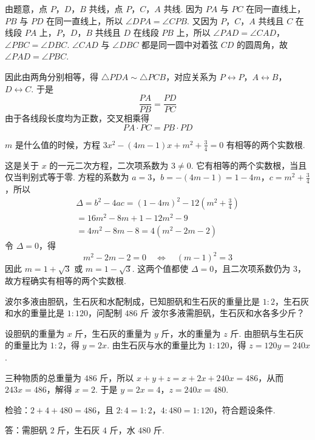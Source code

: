 \begin{solution}

由题意，点 \(P\)，\(D\)，\(B\) 共线，点 \(P\)，\(C\)，\(A\) 共线. 因为 \(PA\) 与 \(PC\) 在同一直线上，\(PB\) 与 \(PD\) 在同一直线上，所以 \(\angle DPA=\angle CPB\). 又因为 \(P\)，\(C\)，\(A\) 共线且 \(C\) 在线段 \(PA\) 上，\(P\)，\(D\)，\(B\) 共线且 \(D\) 在线段 \(PB\) 上，所以 \(\angle PAD=\angle CAD\)，\(\angle PBC=\angle DBC\). \(\angle CAD\) 与 \(\angle DBC\) 都是同一圆中对着弦 \(CD\) 的圆周角，故 \(\angle PAD=\angle PBC\).

因此由两角分别相等，得 \(\triangle PDA\sim\triangle PCB\)，对应关系为 \(P\leftrightarrow P\)，\(A\leftrightarrow B\)，\(D\leftrightarrow C\). 于是
\[
\frac{PA}{PB}=\frac{PD}{PC}
\]
由于各线段长度均为正数，交叉相乘得
\[
PA\cdot PC=PB\cdot PD
\]
\end{solution}

\begin{problem}
\(m\) 是什么值的时候，方程 \(3x^2-\left(4m-1\right)x+m^2+\frac{3}{4}=0\) 有相等的两个实数根.
\end{problem}

\begin{solution}
这是关于 \(x\) 的一元二次方程，二次项系数为 \(3\ne0\). 它有相等的两个实数根，当且仅当判别式等于零. 方程的系数为 \(a=3\)，\(b=-(4m-1)=1-4m\)，\(c=m^2+\frac{3}{4}\)，所以
\[
\begin{gathered}
\Delta=b^2-4ac
=(1-4m)^2-12\left(m^2+\frac{3}{4}\right)\\
=16m^2-8m+1-12m^2-9\\
=4m^2-8m-8=4\left(m^2-2m-2\right)
\end{gathered}
\]
令 \(\Delta=0\)，得
\[
m^2-2m-2=0\quad\Longleftrightarrow\quad\left(m-1\right)^2=3
\]
因此 \(m=1+\sqrt{3}\) 或 \(m=1-\sqrt{3}\). 这两个值都使 \(\Delta=0\)，且二次项系数仍为 \(3\)，故方程确实有相等的两个实数根.
\end{solution}

\begin{problem}
波尔多液由胆矾，生石灰和水配制成，已知胆矾和生石灰的重量比是 \(1:2\)，生石灰和水的重量比是 \(1:120\)，问配制 \(486\text{ 斤}\) 波尔多液需胆矾，生石灰和水各多少斤？
\end{problem}

\begin{solution}
设胆矾的重量为 \(x\text{ 斤}\)，生石灰的重量为 \(y\text{ 斤}\)，水的重量为 \(z\text{ 斤}\). 由胆矾与生石灰的重量比为 \(1:2\)，得 \(y=2x\). 由生石灰与水的重量比为 \(1:120\)，得 \(z=120y=240x\).

三种物质的总重量为 \(486\text{ 斤}\)，所以 \(x+y+z=x+2x+240x=486\)，从而 \(243x=486\)，解得 \(x=2\). 于是 \(y=2x=4\)，\(z=240x=480\).

检验：\(2+4+480=486\)，且 \(2:4=1:2\)，\(4:480=1:120\)，符合题设条件.

答：需胆矾 \(2\text{ 斤}\)，生石灰 \(4\text{ 斤}\)，水 \(480\text{ 斤}\).
\end{solution}

